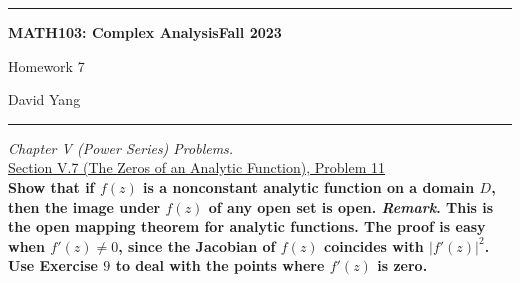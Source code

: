 \documentclass[11pt]{article}
\theoremstyle{definition}
\begin{document}
	\hrule
	\begin{center}
        \textbf{MATH103: Complex Analysis}\hfill \textbf{Fall 2023}\newline


		{\Large Homework 7}

		David Yang
	\end{center}

\hrule

\vspace{1em}


\textit{Chapter V (Power Series) Problems.} \\


\underline{Section V.7 (The Zeros of an Analytic Function), Problem 11}\\

\textbf{Show that if $f(z)$ is a nonconstant analytic function on a domain $D$, then the image under $f(z)$ of any open set is open.
\textit{Remark}. This is the open mapping theorem for analytic functions. The proof is easy when $f'(z) \neq 0$, since the Jacobian of $f(z)$ coincides with $|f'(z)|^2$. Use Exercise $9$ to deal with the points where $f'(z)$ is zero.}
\end{document}
